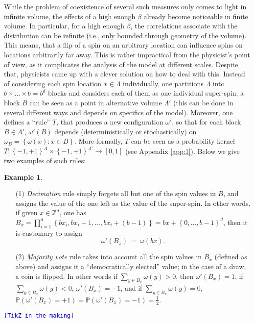 \documentclass[12pt]{article}
\renewcommand{\P}{\mathbb{P}}
\newcommand{\Z}{\mathbb{Z}}
\newcommand{\set}[1]{\left\{#1\right\}}
\newcommand{\ra}{\rightarrow}
\newcommand{\1}{\mathbbm{1}}
\newcommand{\5}{\vspace{0.5cm}}
\theoremstyle{definition}
\newtheorem{ex}[thm]{Example}
\begin{document}
While the problem of coexistence of several such measures only comes to light in infinite volume, the effects of a high enough $\beta$ already become noticeable in finite volume. In particular, for a high enough $\beta$, the correlations associate with the distribution can be infinite (i.e., only bounded through geometry of the volume). This means, that a flip of a spin on an arbitrary location can influence spins on locations arbitrarily far away. This is rather impractical from the physicist's point of view, as it complicates the analysis of the model at different scales. Despite that, physicists came up with a clever solution on how to deal with this. Instead of considering each spin location $x\in\Lambda$ individually, one partitions $\Lambda$ into $b\times\ldots\times b=b^d$ blocks and considers each of them as one individual super-spin; a block $B$ can be seen as a point in alternative volume $\Lambda'$ (this can be done in several different ways and depends on specifics of the model). Moreover, one defines a ``rule'' $T$, that produces a new configuration $\omega'$, so that for each block $B\in\Lambda'$, $\omega'(B)$ depends (deterministically or stochastically) on $\omega_B=\set{\omega(x):x\in B}$. More formally, $T$ can be seen as a probability kernel $T:\set{-1,+1}^{\Lambda}\times\set{-1,+1}^{\Lambda'}\ra[0,1]$ (see Appendix \ref{app:1}). Below we give two examples of such rules:

\begin{ex}\label{RG:example}
~
\begin{itemize}
	\item[(1)] \textit{Decimation} rule simply forgets all but one of the spin values in $B$, and assigns the value of the one left as the value of the super-spin. In other words, if given $x\in\Z^d$, one has $B_x=\prod_{i=1}^d \set{b x_i,b x_i+1,\ldots,b x_i+(b-1)}=bx+\set{0,\ldots,b-1}^d$, then it is customary to assign
	$$\omega'(B_x) ~=~ \omega(bx).$$
	\item[(2)] \textit{Majority vote} rule takes into account all the spin values in $B_x$ (defined as above) and assigns it a ``democratically elected'' value; in the case of a draw, a coin is flipped. In other words if $\sum_{y\in B_x}\omega(y)>0$, then $\omega'(B_x)=1$, if $\sum_{y\in B_x}\omega(y)<0$, $\omega'(B_x)=-1$, and if $\sum_{y\in B_x}\omega(y)=0$, $\P(\omega'(B_x)=+1)=\P(\omega'(B_x)=-1)=\frac{1}{2}$.
\end{itemize}
\end{ex}

\textcolor{blue}{\texttt{[TikZ in the making]}} \\
\end{document}
